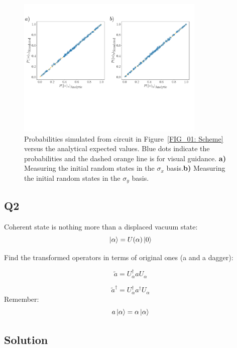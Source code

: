 \documentclass[12pt]{article}
\begin{document}
\begin{appendices}
    \begin{figure}[h]
        \includegraphics[width=0.8\textwidth]{Probabilities.pdf}
       \caption{\label{FIG_02: Probabilities} Probabilities simulated from circuit in Figure~\ref{FIG_01: Scheme} versus the analytical expected values. Blue dots indicate the probabilities and the dashed orange line is for visual guidance. \textbf{a)} Measuring the initial random states in the $\sigma_x$ basis.\textbf{b)} Measuring the initial random states in the $\sigma_y$ basis.} 
    \end{figure} 



\subsection*{Q2}
Coherent state is nothing more than a displaced vacuum state:
\begin{equation}
    \ket{\alpha} = U(\alpha)\ket{0}
\end{equation}

Find the transformed operators in terms of original ones (a and a dagger):

\begin{equation}
    \tilde{a} = U^{\dagger}_\alpha a U_\alpha
\end{equation}

\begin{equation}
    {\tilde{a}}^{\dagger} = U^{\dagger}_\alpha a^{\dagger} U_\alpha
\end{equation}
Remember:
\begin{equation}
    a\ket{\alpha} = \alpha\ket{\alpha}
\end{equation}

\subsection*{Solution}




\end{appendices}
\end{document}
